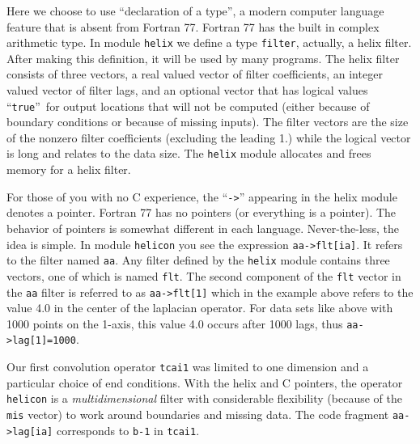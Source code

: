 \par
Here we choose to use
``declaration of a type'',
a modern computer language feature that is absent from Fortran 77.
Fortran 77 has the built in complex arithmetic type.
In module \texttt{helix}
we define a type \texttt{filter}, actually, a helix filter.
After making this definition, it will be used by many programs.
The helix filter consists of three vectors,
a real valued vector of filter coefficients,
an integer valued vector of filter lags,
and an optional vector
that has logical values ``\texttt{true}''~for
output locations that will not be computed
(either because of boundary conditions or because of missing inputs).
The filter vectors are the size of the nonzero filter coefficients
(excluding the leading 1.) while the logical vector is long
and relates to the data size.
The \texttt{helix} module allocates and frees memory for a helix filter.
\par
For those of you with no C  experience,
the ``\verb#->#'' appearing in the helix module denotes a pointer.
Fortran 77 has no pointers (or everything is a pointer).
The behavior of pointers is somewhat different in each language.
Never-the-less, the idea is simple.
In module \texttt{helicon} %
you see the expression
\verb#aa->flt[ia]#.
It refers to the filter named \texttt{aa}.
Any filter defined by the \texttt{helix} module
contains three vectors, one of which is named \texttt{flt}.
The second component of the \texttt{flt} vector
in the \texttt{aa} filter
is referred to as
\verb#aa->flt[1]# which
in the example above refers to the value 4.0
in the center of the laplacian operator.
For data sets like above with 1000 points on the 1-axis,
this value 4.0 occurs after 1000 lags,
thus \verb#aa->lag[1]=1000#.

\par
Our first convolution operator
\texttt{tcai1}
was limited to one dimension and a particular choice of end conditions.
With the helix and C pointers,
the operator
\texttt{helicon} %
is a {\it multidimensional} filter
with considerable flexibility (because of the \texttt{mis} vector)
to work around boundaries and missing data.
The code fragment
\verb#aa->lag[ia]#
corresponds to 
\texttt{b-1}
in \texttt{tcai1}.


